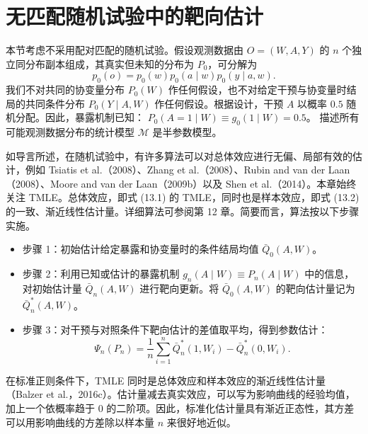 \section{无匹配随机试验中的靶向估计}
\label{sec:ch13-without-matching}

本节考虑不采用配对匹配的随机试验。假设观测数据由 $O=(W,A,Y)$ 的 $n$ 个独立同分布副本组成，其真实但未知的分布为 $P_0$，可分解为
\[
 p_0(o)=p_0(w)p_0(a\mid w)p_0(y\mid a,w).
\]
我们不对共同的协变量分布 $P_0(W)$ 作任何假设，也不对给定干预与协变量时结局的共同条件分布 $P_0(Y\mid A,W)$ 作任何假设。根据设计，干预 $A$ 以概率 $0.5$ 随机分配。因此，暴露机制已知：
$P_0(A=1\mid W)\equiv g_0(1\mid W)=0.5$。
描述所有可能观测数据分布的统计模型 $\mathcal M$ 是半参数模型。

如导言所述，在随机试验中，有许多算法可以对总体效应进行无偏、局部有效的估计，例如 Tsiatis et al.（2008）、Zhang et al.（2008）、Rubin and van der Laan（2008）、Moore and van der Laan（2009b）以及 Shen et al.（2014）。本章始终关注 TMLE。总体效应，即式 (13.1) 的 TMLE，同时也是样本效应，即式 (13.2) 的一致、渐近线性估计量。详细算法可参阅第 12 章。简要而言，算法按以下步骤实施。
\begin{itemize}
 \item 步骤 1：初始估计给定暴露和协变量时的条件结局均值 $\bar Q_0(A,W)$。
 \item 步骤 2：利用已知或估计的暴露机制
 $g_n(A\mid W)\equiv P_n(A\mid W)$
 中的信息，对初始估计量 $\bar Q_n(A,W)$ 进行靶向更新。将 $\bar Q_0(A,W)$ 的靶向估计量记为 $\bar Q_n^*(A,W)$。
 \item 步骤 3：对干预与对照条件下靶向估计的差值取平均，得到参数估计：
 \[
  \Psi_n(P_n)=\frac1n\sum_{i=1}^n\bar Q_n^*(1,W_i)-\bar Q_n^*(0,W_i).
 \]
\end{itemize}
在标准正则条件下，TMLE 同时是总体效应和样本效应的渐近线性估计量（Balzer et al.，2016c）。估计量减去真实效应，可以写为影响曲线的经验均值，加上一个依概率趋于 $0$ 的二阶项。因此，标准化估计量具有渐近正态性，其方差可以用影响曲线的方差除以样本量 $n$ 来很好地近似。

